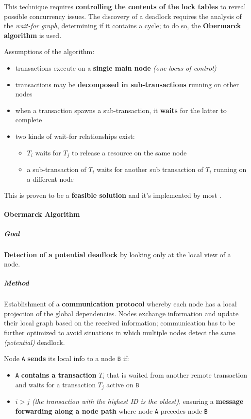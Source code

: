 \documentclass[english]{article}
\begin{document}
This technique requires \textbf{controlling the contents of the lock tables} to reveal possible concurrency issues.
The discovery of a deadlock requires the analysis of the \textit{wait-for graph}, determining if it contains a cycle;
to do so, the \textbf{Obermarck algorithm} is used.

Assumptions of the algorithm:

\begin{itemize}
  \item transactions execute on a \textbf{single main node} \textit{(one locus of control)}
  \item transactions may be \textbf{decomposed in sub-transactions} running on other nodes
  \item when a transaction spawns a sub-transaction, it \textbf{waits} for the latter to complete
  \item two kinds of wait-for relationships exist:
        \begin{itemize}
          \item \(T_i\) waits for \(T_j\) to release a resource on the same node
          \item a sub-transaction of \(T_i\) waits for another sub transaction of \(T_i\) running on a different node
        \end{itemize}
\end{itemize}

This is proven to be a \textbf{feasible solution} and it's implemented by most \dbms.

\paragraph{Obermarck Algorithm}

\subparagraph*{Goal}
\textbf{Detection of a potential deadlock} by looking only at the local view of a node.

\subparagraph*{Method}
Establishment of a \textbf{communication protocol} whereby each node has a local projection of the global dependencies.
Nodes exchange information and update their local graph based on the received information;
communication has to be further optimized to avoid situations in which multiple nodes detect the same \textit{(potential)} deadlock.

\bigskip
Node \texttt{A} \textbf{sends} its local info to a node \texttt{B} if:

\begin{itemize}
  \item \texttt{A} \textbf{contains a transaction} \(T_i\) that is waited from another remote transaction and waits for a transaction \(T_j\) active on \texttt{B}
  \item \(i > j\) \textit{(the transaction with the highest ID is the oldest)}, ensuring a \textbf{message forwarding along a node path} where node \texttt{A} precedes node \texttt{B}
\end{itemize}
\end{document}
